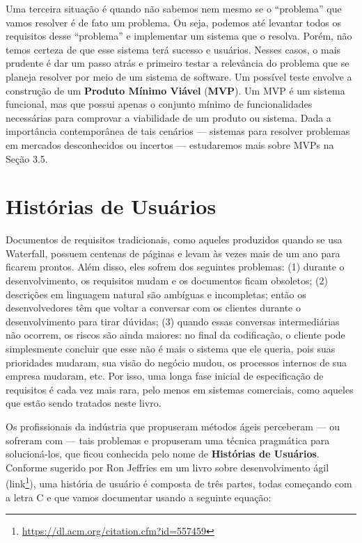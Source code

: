 \documentclass[
  11pt,
  twoside]{book}
\DeclareRobustCommand{\href}[2]{#2\footnote{\url{#1}}}
\begin{document}
Uma terceira situação é quando não sabemos nem mesmo se o ``problema''
que vamos resolver é de fato um problema. Ou seja, podemos até levantar
todos os requisitos desse ``problema'' e implementar um sistema que o
resolva. Porém, não temos certeza de que esse sistema terá sucesso e
usuários. Nesses casos, o mais prudente é dar um passo atrás e primeiro
testar a relevância do problema que se planeja resolver por meio de um
sistema de software. Um possível teste envolve a construção de um
\textbf{Produto Mínimo Viável} (\textbf{MVP}). Um MVP é um sistema
funcional, mas que possui apenas o conjunto mínimo de funcionalidades
necessárias para comprovar a viabilidade de um produto ou sistema. Dada
a importância contemporânea de tais cenários --- sistemas para resolver
problemas em mercados desconhecidos ou incertos --- estudaremos mais
sobre MVPs na Seção 3.5.

\hypertarget{histuxf3rias-de-usuuxe1rios}{%
\section{Histórias de Usuários}\label{histuxf3rias-de-usuuxe1rios}}

 Documentos de requisitos tradicionais,
como aqueles produzidos quando se usa Waterfall, possuem centenas de
páginas e levam às vezes mais de um ano para ficarem prontos. Além
disso, eles sofrem dos seguintes problemas: (1) durante o
desenvolvimento, os requisitos mudam e os documentos ficam obsoletos;
(2) descrições em linguagem natural são ambíguas e incompletas; então os
desenvolvedores têm que voltar a conversar com os clientes durante o
desenvolvimento para tirar dúvidas; (3) quando essas conversas
intermediárias não ocorrem, os riscos são ainda maiores: no final da
codificação, o cliente pode simplesmente concluir que esse não é mais o
sistema que ele queria, pois suas prioridades mudaram, sua visão do
negócio mudou, os processos internos de sua empresa mudaram, etc. Por
isso, uma longa fase inicial de especificação de requisitos é cada vez
mais rara, pelo menos em sistemas comerciais, como aqueles que estão
sendo tratados neste livro.

Os profissionais da indústria que propuseram métodos ágeis perceberam
--- ou sofreram com --- tais problemas e propuseram uma técnica
pragmática para solucioná-los, que ficou conhecida pelo nome de
\textbf{Histórias de Usuários}. Conforme sugerido por Ron Jeffries em um
livro sobre desenvolvimento ágil
(\href{https://dl.acm.org/citation.cfm?id=557459}{link}), uma história
de usuário é composta de três partes, todas começando com a letra C e
que vamos documentar usando a seguinte equação:
\end{document}
